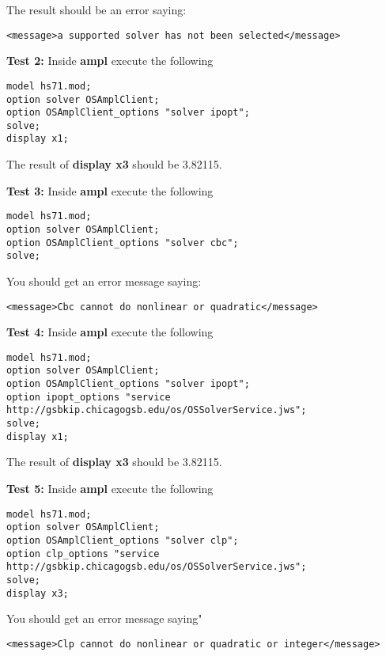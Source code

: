 \begin{itemize}
\begin{itemize}
The result should be an error saying:
\begin{verbatim}
<message>a supported solver has not been selected</message>
\end{verbatim}
 
 \vskip 10pt
 
 {\bf Test 2:}  Inside  {\bf ampl} execute the following
 


\begin{verbatim}
model hs71.mod;
option solver OSAmplClient;
option OSAmplClient_options "solver ipopt";
solve;
display x1;
\end{verbatim}

The result of {\bf display x3} should be 3.82115. 


 \vskip 10pt
 
 {\bf Test 3:}  Inside  {\bf ampl} execute the following
 


\begin{verbatim}
model hs71.mod;
option solver OSAmplClient;
option OSAmplClient_options "solver cbc";
solve;
\end{verbatim}

You should get an error message saying:
\begin{verbatim}
<message>Cbc cannot do nonlinear or quadratic</message>
\end{verbatim}


\vskip 10pt

{\small
{\bf Test 4:}  Inside  {\bf ampl} execute the following
\begin{verbatim}
model hs71.mod;
option solver OSAmplClient;
option OSAmplClient_options "solver ipopt";
option ipopt_options "service http://gsbkip.chicagogsb.edu/os/OSSolverService.jws";
solve;
display x1;
\end{verbatim}
}%

The result of {\bf display x3} should be 3.82115. 


\vskip 10pt

{\small
{\bf Test 5:}  Inside  {\bf ampl} execute the following
\begin{verbatim}
model hs71.mod;
option solver OSAmplClient;
option OSAmplClient_options "solver clp";
option clp_options "service http://gsbkip.chicagogsb.edu/os/OSSolverService.jws";
solve;
display x3;
\end{verbatim}
}%

You should get an error message saying"
\begin{verbatim}
<message>Clp cannot do nonlinear or quadratic or integer</message>
\end{verbatim}




\end{itemize}
\end{itemize}
